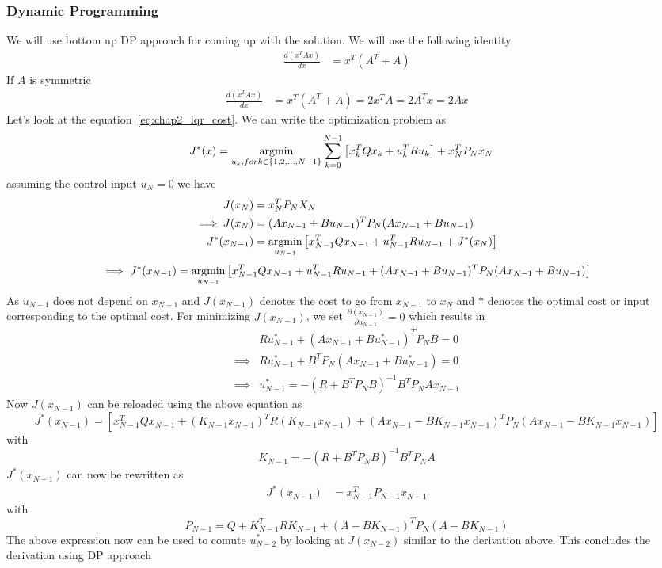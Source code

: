 \subsubsection{Dynamic Programming}
We will use bottom up DP approach for coming up with the solution.
We will use the following identity 
\begin{align}
    \frac{d(x^TAx)}{dx} &= x^T(A^T+A)
\end{align}
If $A$ is symmetric
\begin{align}
    \frac{d(x^TAx)}{dx} &= x^T(A^T+A)=2x^TA=2A^Tx=2Ax
\end{align}
Let's look at the equation~\ref{eq:chap2_lqr_cost}. We can write the optimization problem as
\begin{align}
    J^*(x) &= \operatorname*{argmin}_{u_k, for k \in \{1, 2, ..., N-1\}}\sum_{k=0}^{N-1}\left[x_k^TQx_k + u_k^TRu_k \right] + x^T_NP_Nx_N
\end{align}
assuming the control input $u_N=0$
we have
\begin{align}
    J(x_{N}) &= x_N^TP_NX_N \\
    \implies J(x_N) &= (Ax_{N-1}+Bu_{N-1})^TP_N(Ax_{N-1}+Bu_{N-1})\\
    J^*(x_{N-1}) &= \operatorname*{argmin}_{u_{N-1}}\left[x_{N-1}^TQx_{N-1} + u_{N-1}^TRu_{N-1} + J^*(x_N)\right] \\
\end{align}
\begin{dmath*}
    \implies J^*(x_{N-1}) = \argmin_{u_{N-1}}\left[x_{N-1}^TQx_{N-1} + u_{N-1}^TRu_{N-1} +  (Ax_{N-1}+Bu_{N-1})^TP_N(Ax_{N-1}+Bu_{N-1})\right]
\end{dmath*}
As $u_{N-1}$ does not depend on $x_{N-1}$ and $J(x_{N-1})$ denotes the cost to go from $x_{N-1}$ to $x_{N}$ and $*$ denotes the optimal cost or input corresponding to the optimal cost.
For minimizing $J(x_{N-1})$, we set $\frac{\partial (x_{N-1})}{\partial u_{N-1}} = 0$ which results in
\begin{align}
    & Ru^*_{N-1} + (Ax_{N-1}+Bu^*_{N-1})^TP_NB = 0 \\
    \implies & Ru^*_{N-1} + B^TP_N(Ax_{N-1}+Bu^*_{N-1}) = 0 \\
    \implies & u^*_{N-1} = -(R+B^TP_NB)^{-1}B^TP_NAx_{N-1}
\end{align}
Now $J(x_{N-1})$ can be reloaded using the above equation as
\begin{dmath*}
    J^*(x_{N-1}) = \left[x_{N-1}^TQx_{N-1} + (K_{N-1}x_{N-1})^TR(K_{N-1}x_{N-1}) + (Ax_{N-1}-BK_{N-1}x_{N-1})^TP_N(Ax_{N-1}-BK_{N-1}x_{N-1})\right]
\end{dmath*}
with $$K_{N-1} = -(R+B^TP_NB)^{-1}B^TP_NA$$
$J^*(x_{N-1})$ can now be rewritten as 
\begin{align}
    J^*(x_{N-1}) &= x_{N-1}^TP_{N-1}x_{N-1}
\end{align}
with
$$P_{N-1}= Q+K^T_{N-1}RK_{N-1}+(A-BK_{N-1})^TP_{N}(A-BK_{N-1})$$
The above expression now can be used to comute $u^*_{N-2}$ by looking at $J(x_{N-2})$ similar to the derivation above.
This concludes the derivation using DP approach
